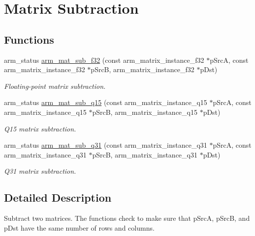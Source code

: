 \hypertarget{group__MatrixSub}{}\section{Matrix Subtraction}
\label{group__MatrixSub}
\subsection*{Functions}
\begin{DoxyCompactItemize}
\item 
arm\+\_\+status \hyperlink{group__MatrixSub_gac8b72fb70246ccfee3b372002345732c}{arm\+\_\+mat\+\_\+sub\+\_\+f32} (const arm\+\_\+matrix\+\_\+instance\+\_\+f32 $\ast$p\+SrcA, const arm\+\_\+matrix\+\_\+instance\+\_\+f32 $\ast$p\+SrcB, arm\+\_\+matrix\+\_\+instance\+\_\+f32 $\ast$p\+Dst)
\begin{DoxyCompactList}\small\item\em Floating-\/point matrix subtraction. \end{DoxyCompactList}\item 
arm\+\_\+status \hyperlink{group__MatrixSub_gaf647776a425b7f9dd0aca3e11d81f02f}{arm\+\_\+mat\+\_\+sub\+\_\+q15} (const arm\+\_\+matrix\+\_\+instance\+\_\+q15 $\ast$p\+SrcA, const arm\+\_\+matrix\+\_\+instance\+\_\+q15 $\ast$p\+SrcB, arm\+\_\+matrix\+\_\+instance\+\_\+q15 $\ast$p\+Dst)
\begin{DoxyCompactList}\small\item\em Q15 matrix subtraction. \end{DoxyCompactList}\item 
arm\+\_\+status \hyperlink{group__MatrixSub_ga39f42e0e3b7f115fbb909d6ff4e1329d}{arm\+\_\+mat\+\_\+sub\+\_\+q31} (const arm\+\_\+matrix\+\_\+instance\+\_\+q31 $\ast$p\+SrcA, const arm\+\_\+matrix\+\_\+instance\+\_\+q31 $\ast$p\+SrcB, arm\+\_\+matrix\+\_\+instance\+\_\+q31 $\ast$p\+Dst)
\begin{DoxyCompactList}\small\item\em Q31 matrix subtraction. \end{DoxyCompactList}\end{DoxyCompactItemize}


\subsection{Detailed Description}
Subtract two matrices.  The functions check to make sure that {\ttfamily p\+SrcA}, {\ttfamily p\+SrcB}, and {\ttfamily p\+Dst} have the same number of rows and columns. 

